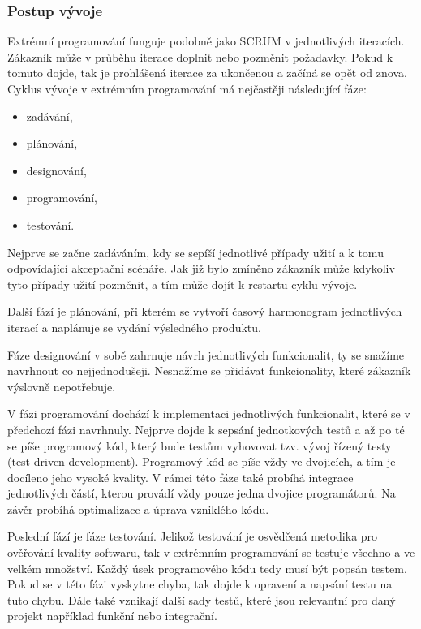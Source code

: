 \documentclass[czech,DP]{thesiskiv}
\begin{document}
\subsubsection{Postup vývoje}
Extrémní programování funguje podobně jako SCRUM v jednotlivých iteracích. Zákazník může v průběhu iterace doplnit nebo pozměnit požadavky. Pokud k tomuto dojde, tak je prohlášená iterace za ukončenou a začíná se opět od znova. Cyklus vývoje v extrémním programování má nejčastěji následující fáze:
\begin{itemize}
    \item zadávání,
    \item plánování,
    \item designování,
    \item programování,
    \item testování.
\end{itemize}
Nejprve se začne zadáváním, kdy se sepíší jednotlivé případy užití a k tomu odpovídající akceptační scénáře. Jak již bylo zmíněno zákazník může kdykoliv tyto případy užití pozměnit, a tím může dojít k restartu cyklu vývoje.
\par
Další fází je plánování, při kterém se vytvoří časový harmonogram jednotlivých iterací a naplánuje se vydání výsledného produktu.
\par
Fáze designování v sobě zahrnuje návrh jednotlivých funkcionalit, ty se snažíme navrhnout co nejjednodušeji. Nesnažíme se přidávat funkcionality, které zákazník výslovně nepotřebuje.
\par
V fázi programování dochází k implementaci jednotlivých funkcionalit, které se v předchozí fázi navrhnuly. Nejprve dojde k sepsání jednotkových testů a až po té se píše programový kód, který bude testům vyhovovat tzv. vývoj řízený testy (test driven development). Programový kód se píše vždy ve dvojicích, a tím je docíleno jeho vysoké kvality. V rámci této fáze také probíhá integrace jednotlivých částí, kterou provádí vždy pouze jedna dvojice programátorů. Na závěr probíhá optimalizace a úprava vzniklého kódu.
\par
Poslední fází je fáze testování. Jelikož testování je osvědčená metodika pro ověřování kvality softwaru, tak v extrémním programování se testuje všechno a ve velkém množství. Každý úsek programového kódu tedy musí být popsán testem. Pokud se v této fázi vyskytne chyba, tak dojde k opravení a napsání testu na tuto chybu. Dále také vznikají další sady testů, které jsou relevantní pro daný projekt například funkční nebo integrační.\cite{metodiky}
\par
\end{document}

